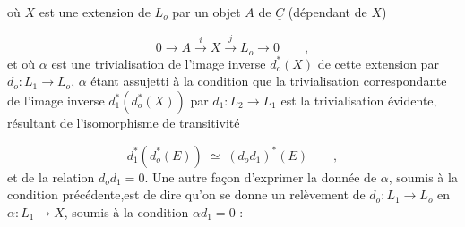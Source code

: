  où $X$ est une extension de $L_o$ par un objet $A$ de $\underline{C}$ (dépendant de $X$)

\begin{equation}\tag{3.1.2}
0 \longrightarrow A \overset{i}{\longrightarrow} X \overset{j}{\longrightarrow} L_o \longrightarrow 0 \qquad ,
\end{equation}
et où $\alpha$ est une trivialisation de l'image inverse $d^*_o(X)$ de cette extension par $d_o:L_1 \longrightarrow L_o$, $\alpha$ étant assujetti à la condition que la trivialisation correspondante de l'image inverse $d^*_1(d^*_o(X))$ par $d_1 : L_2 \longrightarrow L_1$ est la trivialisation évidente, résultant de l'isomorphisme de transitivité

\begin{equation*}
d^*_1(d^*_o(E)) \;\simeq\; (d_o d_1)^*(E) \qquad ,
\end{equation*}
et de la relation $d_od_1=0$. Une autre façon d'exprimer la donnée de $\alpha$, soumis à la condition précédente,est de dire qu'on se donne un relèvement de $d_o : L_1 \longrightarrow L_o$ en $\alpha : L_1 \longrightarrow X$, soumis à la condition $\alpha d_1 = 0$ :

